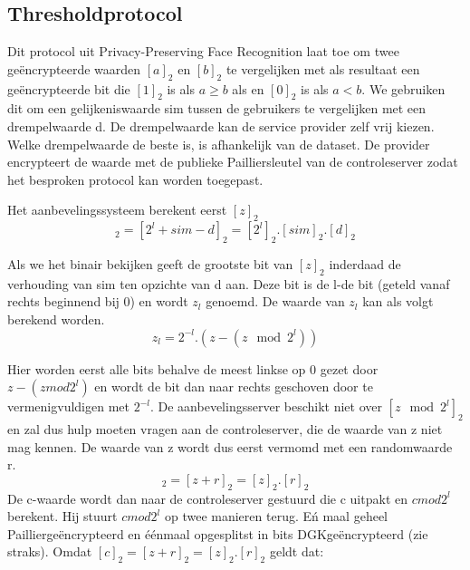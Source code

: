 \subsection{Thresholdprotocol}
\label{threshold}

Dit protocol uit Privacy-Preserving Face Recognition \cite{facerecog} laat toe om twee ge\"encrypteerde waarden $[a]_2$ en $[b]_2$ te vergelijken met als resultaat een ge\"encrypteerde bit die $[1]_2$ is als $a \geq b$ als en $[0]_2$ is als $a < b$. We gebruiken dit om een gelijkeniswaarde sim tussen de gebruikers te vergelijken met een drempelwaarde d. De drempelwaarde kan de service provider zelf vrij kiezen. Welke drempelwaarde de beste is, is afhankelijk van de dataset. De provider encrypteert de waarde met de publieke Pailliersleutel van de controleserver zodat het besproken protocol kan worden toegepast.

Het aanbevelingssysteem berekent eerst $[z]_2$
\begin{equation}
[z]_2 = [2^l + sim - d]_2 =[2^l]_2.[sim]_2.[d]_2  \end{equation}

Als we het binair bekijken geeft de grootste bit van $[z]_2$  inderdaad de verhouding van sim ten opzichte van d aan.
Deze bit is de l-de bit (geteld vanaf rechts beginnend bij 0) en wordt $z_l$ genoemd. De waarde van $z_l$ kan als volgt berekend worden.
\begin{equation}
\label{zl}
z_l = 2^{-l}.(z-(z\mod 2^l)) \end{equation}

Hier worden eerst alle bits behalve de meest linkse op 0 gezet door $z-(zmod2^l)$ en wordt de bit dan naar rechts geschoven door te vermenigvuldigen met $2^{-l}$. De aanbevelingsserver beschikt niet over $[z\mod 2^l]_2$ en zal dus hulp moeten vragen aan de controleserver, die de waarde van z niet mag kennen. De waarde van z wordt dus eerst vermomd met een randomwaarde r.
\begin{equation}
[c]_2= [z+r]_2 = [z]_2.[r]_2 \end{equation}
De c-waarde wordt dan naar de controleserver gestuurd die c uitpakt en $cmod2^l$ berekent. Hij stuurt $cmod2^l$ op twee manieren terug. E\'n maal geheel Paillierge\"encrypteerd en \'e\'enmaal opgesplitst in bits DGKge\"encrypteerd (zie straks). Omdat $[c]_2= [z+r]_2 = [z]_2.[r]_2$ geldt dat:

